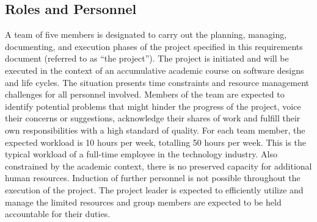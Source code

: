 \documentclass[12pt]{article}
\begin{document}
\subsection{Roles and Personnel}
A team of five members is designated to carry out the planning, managing, documenting, and execution phases of the project specified in this requirements document (referred to as “the project”). The project is initiated and will be executed in the context of an accumulative academic course on software designs and life cycles. The situation presents time constraints and resource management challenges for all personnel involved. Members of the team are expected to identify potential problems that might hinder the progress of the project, voice their concerns or suggestions, acknowledge their shares of work and fulfill their own responsibilities with a high standard of quality. For each team member, the expected workload is 10 hours per week, totalling 50 hours per week. This is the typical workload of a full-time employee in the technology industry. Also constrained by the academic context, there is no preserved capacity for additional human resources. Induction of further personnel is not possible throughout the execution of the project. The project leader is expected to efficiently utilize and manage the limited resources and group members are expected to be held accountable for their duties.
\end{document}
